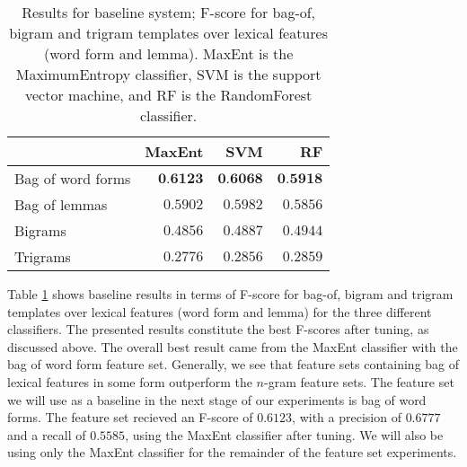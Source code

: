 \documentclass[11pt,letterpaper]{article}
\begin{document}
\begin{table}
  \begin{center}
    \begin{tabular}{lrrr}
      \toprule

      & MaxEnt & SVM & RF \\
      \midrule
      Bag of word forms & $\textbf{0.6123}$ & $\textbf{0.6068}$ & $\textbf{0.5918}$ \\ %
      Bag of lemmas & $0.5902$ & $0.5982$ & $0.5856$ \\
      Bigrams & $0.4856$ & $0.4887$ & $0.4944$ \\
      Trigrams & $0.2776$ & $0.2856$ & $0.2859$ \\
      
      
      \bottomrule
    \end{tabular}
  \end{center}
  \caption{Results for baseline system; F-score for bag-of, bigram and trigram templates over lexical features (word form and lemma). MaxEnt is the MaximumEntropy classifier, SVM is the support vector machine, and RF is the RandomForest classifier.}
  \label{tab:baseline}
\end{table}

Table \ref{tab:baseline} shows baseline results in terms of F-score for bag-of, bigram and trigram templates over lexical features (word form and lemma) for the three different classifiers. The presented results constitute the best F-scores after tuning, as discussed above. The overall best result came from the MaxEnt classifier with the bag of word form feature set. Generally, we see that feature sets containing bag of lexical features in some form outperform the $n$-gram feature sets. The feature set we will use as a baseline in the next stage of our experiments is bag of word forms. The feature set recieved an F-score of $0.6123$, with a precision of $0.6777$ and a recall of $0.5585$, using the MaxEnt classifier after tuning. We will also be using only the MaxEnt classifier for the remainder of the feature set experiments.
\end{document}
